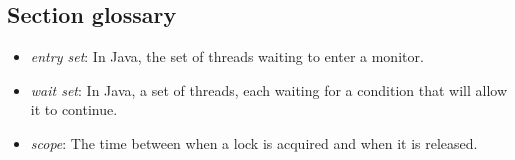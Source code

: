 \subsection{Section glossary}
\begin{itemize}
    \item \textit{entry set}: In Java, the set of threads waiting to enter a monitor.
    \item \textit{wait set}: In Java, a set of threads, each waiting for a condition that will allow it to continue.
    \item \textit{scope}: The time between when a lock is acquired and when it is released.
\end{itemize}
